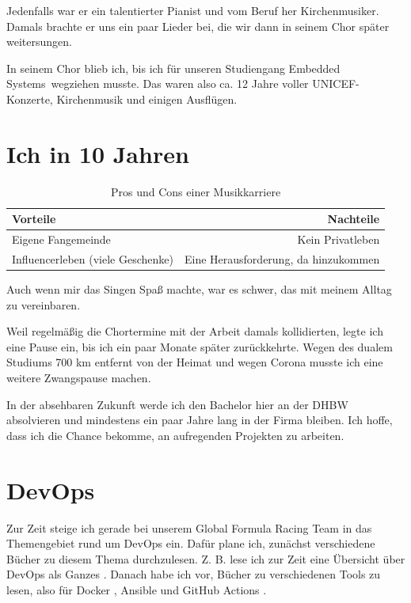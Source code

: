 \documentclass{scrartcl}
\begin{document}
Jedenfalls war er ein talentierter Pianist und vom Beruf her Kirchenmusiker.
Damals brachte er uns ein paar Lieder bei, die wir dann in seinem Chor später
weitersungen.

In seinem Chor blieb ich, bis ich für unseren Studiengang \glqq
Embedded Systems\grqq\ wegziehen musste. Das waren also ca. 12 Jahre voller
UNICEF-Konzerte, Kirchenmusik und einigen Ausflügen.

\section{Ich in 10 Jahren}

\begin{table}[h]
\centering
    \begin{tabular}{|| l | r ||}
        \hline
        Vorteile & Nachteile \\
        \hline
        Eigene Fangemeinde & Kein Privatleben \\
        Influencerleben (viele Geschenke) & 
        Eine Herausforderung, da hinzukommen \\
        \hline
    \end{tabular}
\caption{Pros und Cons einer Musikkarriere}
\end{table}

Auch wenn mir das Singen Spaß machte, war es schwer, das mit meinem Alltag
zu vereinbaren.

Weil regelmäßig die Chortermine mit der Arbeit damals kollidierten, legte ich
eine Pause ein, bis ich ein paar Monate später zurückkehrte. Wegen des dualem
Studiums 700 km entfernt von der Heimat und wegen Corona musste ich eine
weitere Zwangspause machen.

In der absehbaren Zukunft werde ich den Bachelor hier an der DHBW absolvieren
und mindestens ein paar Jahre lang in der Firma bleiben. Ich hoffe, dass ich
die Chance bekomme, an aufregenden Projekten zu arbeiten.

\section{DevOps}
Zur Zeit steige ich gerade bei unserem Global Formula Racing Team in das 
Themengebiet rund um DevOps ein. Dafür plane ich, zunächst verschiedene Bücher
zu diesem Thema durchzulesen. Z. B. lese ich zur Zeit eine Übersicht über
DevOps als Ganzes \autocite{devops}. Danach habe ich vor, Bücher zu
verschiedenen Tools zu lesen, also für Docker \autocite{docker}, Ansible 
\autocite{ansible} und GitHub Actions \autocite{github-actions}.

\printbibliography
\end{document}
